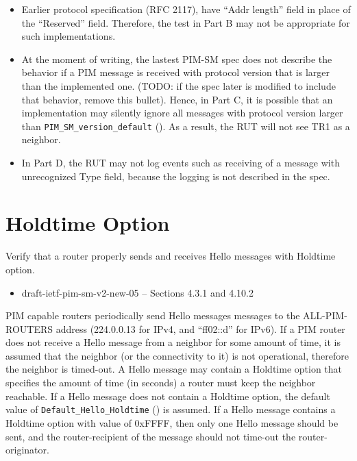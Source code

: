 \documentclass[11pt]{report}
\begin{document}
\begin{itemize}

  \item Earlier protocol specification (RFC 2117), have ``Addr length''
        field in place of the ``Reserved'' field. Therefore, the test in Part
        B may not be appropriate for such implementations.

  \item At the moment of writing, the lastest
        PIM-SM spec does not describe the behavior if a PIM message is
        received with protocol version that is larger than the implemented
        one.
        (TODO: if the spec later is modified to include that behavior,
        remove this bullet).
        Hence, in Part C, it is possible that an implementation may
        silently ignore all messages with protocol version larger than
        \verb=PIM_SM_version_default= ({\PimsmVersionDefault}).
        As a result, the RUT will not see TR1 as a neighbor.

  \item In Part D, the RUT may not log events such as receiving of a message
        with unrecognized Type field, because the logging is not described
        in the spec.

\end{itemize}

\newpage
\section{Holdtime Option}

Verify that a router properly sends and receives Hello messages with Holdtime
option.

\begin{itemize}
  \item draft-ietf-pim-sm-v2-new-05 -- Sections 4.3.1 and 4.10.2
\end{itemize}

PIM capable routers periodically send Hello messages
messages to the ALL-PIM-ROUTERS address (224.0.0.13 for IPv4,
and ``ff02::d'' for IPv6). If a PIM router does not receive a Hello message
from a neighbor for some amount of time, it is assumed that the neighbor (or
the connectivity to it) is not operational, therefore the neighbor is
timed-out. A Hello message may contain a Holdtime option that specifies the
amount of time (in seconds) a router must keep the neighbor reachable.
If a Hello message does not contain a Holdtime option, the default value
of \verb=Default_Hello_Holdtime= ({\PimsmDefaultHelloHoldtime})
is assumed. If a Hello message contains a Holdtime option with value of
0xFFFF, then only one Hello message should be sent, and the router-recipient
of the message should not time-out the router-originator.
\end{document}
